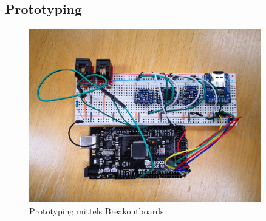 \subsection{Prototyping}
\begin{figure}[hbtp]
\centering
\includegraphics[width=0.9\textwidth]{graphics/prototyping/IMG_20190118_105725.jpg}
\caption{Prototyping mittels Breakoutboards}
\end{figure}
